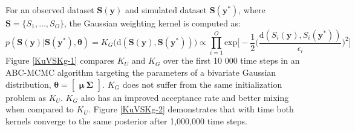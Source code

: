 
For an observed dataset $\bm{S}(\bm{y})$ and simulated dataset $\bm{S}(\bm{y^*})$, where $\bm{S} = \{S_1,\dots,S_O\}$, the Gaussian weighting kernel is computed as:
\begin{equation}
p(\bm{S}(\bm{y})|\bm{S}(\bm{y^*}),\bm{\theta}) = K_G\big(\text{d}(\bm{S}(\bm{y}),\bm{S}(\bm{y^*}))\big) \propto \prod_{i = 1}^{O} \text{exp}\Big[-\frac{1}{2}\Big(\frac{\text{d}(S_i(\bm{y}),S_i(\bm{y^*}))}{\epsilon_i}\Big)^2\Big]
\end{equation}
Figure \ref{KuVSKg-1} compares $K_U$ and $K_G$ over the first 10 000 time steps in an ABC-MCMC algorithm targeting the parameters of a bivariate Gaussian distribution, $\bm{\theta} = \begin{bmatrix}
\bm{\mu}\ \bm{\Sigma}
\end{bmatrix}$. $K_G$ does not suffer from the same initialization problem as $K_U$. $K_G$ also has an improved acceptance rate and better mixing when compared to $K_U$. Figure \ref{KuVSKg-2} demonstrates that with time both kernels converge to the same posterior after 1,000,000 time steps.\par

